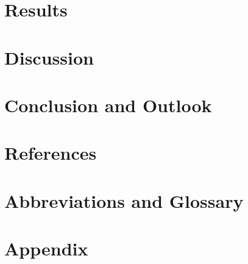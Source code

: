 \section{Results}


\section{Discussion}


\section{Conclusion and Outlook}


\clearpage
\section{References}
\printbibliography[heading=none]

\clearpage
\section*{Abbreviations and Glossary}
\printglossaries

\clearpage
\section{Appendix}
\label{sec:appendix}


